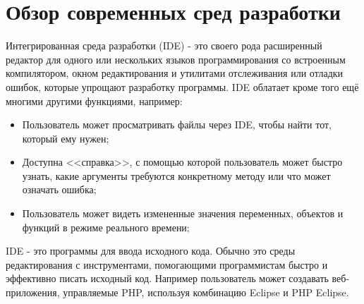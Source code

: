 \chapter{Обзор современных сред разработки}
\label{cha:ch_2}

Интегрированная среда разработки (IDE) - это своего рода расширенный редактор для одного или нескольких 
языков программирования со встроенным компилятором, окном редактирования и утилитами отслеживания или
отладки ошибок, которые упрощают разработку программы. IDE облатает кроме того ещё многими другими 
функциями, например:\\
\begin{itemize}
    \item Пользователь может просматривать файлы через IDE, чтобы найти тот, который ему нужен;\\
    \item Доступна <<справка>>, с помощью которой пользователь может быстро узнать, какие аргументы 
        требуются конкретному методу или что может означать ошибка;\\
    \item Пользователь может видеть измененные значения переменных, объектов и функций в режиме 
        реального времени;\\
\end{itemize}

IDE - это программы для ввода исходного кода. Обычно это среды редактирования с инструментами, 
помогающими программистам быстро и эффективно писать исходный код. Например пользователь может 
создавать веб-приложения, управляемые PHP, используя комбинацию Eclipse и PHP Eclipse.\\

